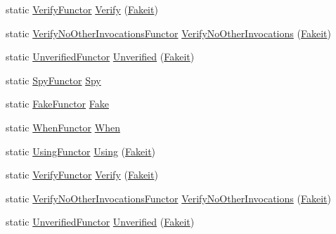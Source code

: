 \begin{DoxyCompactItemize}
\item 
static \mbox{\hyperlink{classfakeit_1_1VerifyFunctor}{Verify\+Functor}} \mbox{\hyperlink{namespacefakeit_a98461e1563bebcff90de1ab7871edfef}{Verify}} (\mbox{\hyperlink{single__header_2tpunit_2fakeit_8hpp_a2b1f324059bec9d07841630bd5c2e7bc}{Fakeit}})
\item 
static \mbox{\hyperlink{classfakeit_1_1VerifyNoOtherInvocationsFunctor}{Verify\+No\+Other\+Invocations\+Functor}} \mbox{\hyperlink{namespacefakeit_a1fdaffe6f7ef1789d8ef832cc4cc19c3}{Verify\+No\+Other\+Invocations}} (\mbox{\hyperlink{single__header_2tpunit_2fakeit_8hpp_a2b1f324059bec9d07841630bd5c2e7bc}{Fakeit}})
\item 
static \mbox{\hyperlink{classfakeit_1_1UnverifiedFunctor}{Unverified\+Functor}} \mbox{\hyperlink{namespacefakeit_aeaed1b328c76d8460e403a1a0d22eb96}{Unverified}} (\mbox{\hyperlink{single__header_2tpunit_2fakeit_8hpp_a2b1f324059bec9d07841630bd5c2e7bc}{Fakeit}})
\item 
static \mbox{\hyperlink{classfakeit_1_1SpyFunctor}{Spy\+Functor}} \mbox{\hyperlink{namespacefakeit_a540f23d3c59c17f86dd99f0a8d845496}{Spy}}
\item 
static \mbox{\hyperlink{classfakeit_1_1FakeFunctor}{Fake\+Functor}} \mbox{\hyperlink{namespacefakeit_a8162a4e2e05662a6ce810ae0b9a7f89e}{Fake}}
\item 
static \mbox{\hyperlink{classfakeit_1_1WhenFunctor}{When\+Functor}} \mbox{\hyperlink{namespacefakeit_ac9c6dd7971865edcc46e075d6408b1bb}{When}}
\item 
static \mbox{\hyperlink{classfakeit_1_1UsingFunctor}{Using\+Functor}} \mbox{\hyperlink{namespacefakeit_a9455b27545764b3433b1ecc507561870}{Using}} (\mbox{\hyperlink{single__header_2tpunit_2fakeit_8hpp_a2b1f324059bec9d07841630bd5c2e7bc}{Fakeit}})
\item 
static \mbox{\hyperlink{classfakeit_1_1VerifyFunctor}{Verify\+Functor}} \mbox{\hyperlink{namespacefakeit_a98461e1563bebcff90de1ab7871edfef}{Verify}} (\mbox{\hyperlink{single__header_2tpunit_2fakeit_8hpp_a2b1f324059bec9d07841630bd5c2e7bc}{Fakeit}})
\item 
static \mbox{\hyperlink{classfakeit_1_1VerifyNoOtherInvocationsFunctor}{Verify\+No\+Other\+Invocations\+Functor}} \mbox{\hyperlink{namespacefakeit_a1fdaffe6f7ef1789d8ef832cc4cc19c3}{Verify\+No\+Other\+Invocations}} (\mbox{\hyperlink{single__header_2tpunit_2fakeit_8hpp_a2b1f324059bec9d07841630bd5c2e7bc}{Fakeit}})
\item 
static \mbox{\hyperlink{classfakeit_1_1UnverifiedFunctor}{Unverified\+Functor}} \mbox{\hyperlink{namespacefakeit_aeaed1b328c76d8460e403a1a0d22eb96}{Unverified}} (\mbox{\hyperlink{single__header_2tpunit_2fakeit_8hpp_a2b1f324059bec9d07841630bd5c2e7bc}{Fakeit}})

\end{DoxyCompactItemize}
